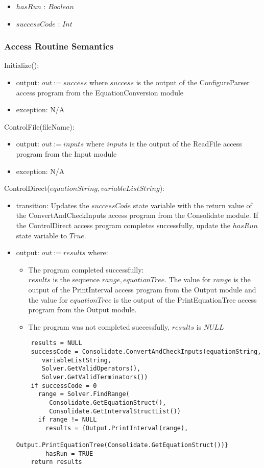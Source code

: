 \documentclass[12pt, titlepage]{article}
\begin{document}
\begin{itemize}
	\item $hasRun$ : $Boolean$
	\item $successCode$ : $Int$
\end{itemize}

\subsubsection{Access Routine Semantics}

\noindent Initialize():
\begin{itemize}
	\item output: $out := success$ where $success$ is the output of the 
	ConfigureParser access program from the EquationConversion module
	\item exception: N/A
\end{itemize}

\noindent ControlFile(fileName):
\begin{itemize}
	\item output: $out := inputs$ where $inputs$ is the output of the 
	ReadFile access program from the Input module
	\item exception: N/A
\end{itemize}

\noindent ControlDirect($equationString, variableListString$):
\begin{itemize}
	\item transition: Updates the $successCode$ state variable with the return 
	value of the ConvertAndCheckInputs access program from the Consolidate 
	module. If the ControlDirect access program completes successfully, update 
	the $hasRun$ state variable to $True$.
	\item output: $out := results$ where:
	\begin{itemize}
		\item The program completed successfully:\\
		$results$ is the sequence $range, equationTree$. The value for $range$ 
		is the output of the PrintInterval access program from the Output 
		module and the value for $equationTree$ is the output of the 
		PrintEquationTree access program from the Output module.
		\item The program was not completed successfully, $results$ is $NULL$
	\end{itemize} 

	\begin{lstlisting}
	results = NULL
	successCode = Consolidate.ConvertAndCheckInputs(equationString, 
	   variableListString, 
	   Solver.GetValidOperators(), 
	   Solver.GetValidTerminators())
	if successCode = 0
	  range = Solver.FindRange(
	     Consolidate.GetEquationStruct(), 
	     Consolidate.GetIntervalStructList())
	  if range != NULL
	    results = {Output.PrintInterval(range), 
	               Output.PrintEquationTree(Consolidate.GetEquationStruct())}
	    hasRun = TRUE
	return results
	\end{lstlisting}
\end{itemize}
\end{document}
